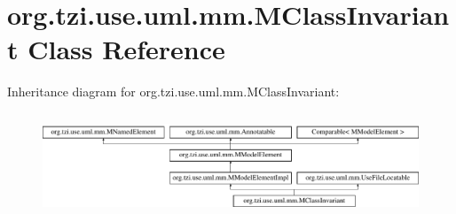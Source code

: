 \hypertarget{classorg_1_1tzi_1_1use_1_1uml_1_1mm_1_1_m_class_invariant}{\section{org.\-tzi.\-use.\-uml.\-mm.\-M\-Class\-Invariant Class Reference}
\label{classorg_1_1tzi_1_1use_1_1uml_1_1mm_1_1_m_class_invariant}
}
Inheritance diagram for org.\-tzi.\-use.\-uml.\-mm.\-M\-Class\-Invariant\-:\begin{figure}[H]
\begin{center}
\leavevmode
\includegraphics[height=3.111111cm]{classorg_1_1tzi_1_1use_1_1uml_1_1mm_1_1_m_class_invariant}
\end{center}
\end{figure}
